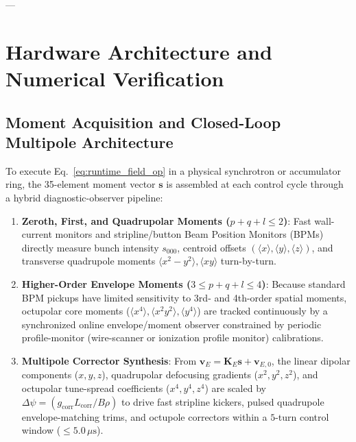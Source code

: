 \documentclass[11pt,a4paper]{article}
\begin{document}
---

\section{Hardware Architecture and Numerical Verification}

\subsection{Moment Acquisition and Closed-Loop Multipole Architecture}
To execute Eq.~\eqref{eq:runtime_field_op} in a physical synchrotron or accumulator ring, the 35-element moment vector $\bm{s}$ is assembled at each control cycle through a hybrid diagnostic-observer pipeline:
\begin{enumerate}
    \item \textbf{Zeroth, First, and Quadrupolar Moments ($p+q+l \le 2$)}: Fast wall-current monitors and stripline/button Beam Position Monitors (BPMs) directly measure bunch intensity $s_{000}$, centroid offsets $(\langle x \rangle, \langle y \rangle, \langle z \rangle)$, and transverse quadrupole moments $\langle x^2 - y^2 \rangle, \langle xy \rangle$ turn-by-turn.
    \item \textbf{Higher-Order Envelope Moments ($3 \le p+q+l \le 4$)}: Because standard BPM pickups have limited sensitivity to 3rd- and 4th-order spatial moments, octupolar core moments ($\langle x^4 \rangle, \langle x^2 y^2 \rangle, \langle y^4 \rangle$) are tracked continuously by a synchronized online envelope/moment observer constrained by periodic profile-monitor (wire-scanner or ionization profile monitor) calibrations.
    \item \textbf{Multipole Corrector Synthesis}: From $\bm{v}_E = \bm{K}_E \bm{s} + \bm{v}_{E,0}$, the linear dipolar components ($x, y, z$), quadrupolar defocusing gradients ($x^2, y^2, z^2$), and octupolar tune-spread coefficients ($x^4, y^4, z^4$) are scaled by $\Delta \psi = (g_{\mathrm{corr}} L_{\mathrm{corr}} / B\rho)$ to drive fast stripline kickers, pulsed quadrupole envelope-matching trims, and octupole correctors within a $5$-turn control window ($\le 5.0\,\mu\mathrm{s}$).
\end{enumerate}
\end{document}
